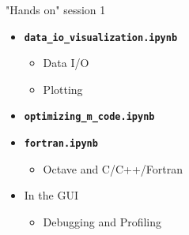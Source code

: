 \begin{frame}{"Hands on" session 1}
\begin{itemize}
\itemsep2em
\item
\textbf{\color{DarkBlue}\texttt{data\_io\_visualization.ipynb}}
\begin{itemize}
\item
Data I/O
\item
Plotting
\end{itemize}

\item
\textbf{\color{DarkBlue}\texttt{optimizing\_m\_code.ipynb}}

\item
\textbf{\color{DarkBlue}\texttt{fortran.ipynb}}
\begin{itemize}
\item
Octave and C/C++/Fortran
\end{itemize}

\item
In the GUI
\begin{itemize}
\item
Debugging and Profiling
\end{itemize}
\end{itemize}
\end{frame}
